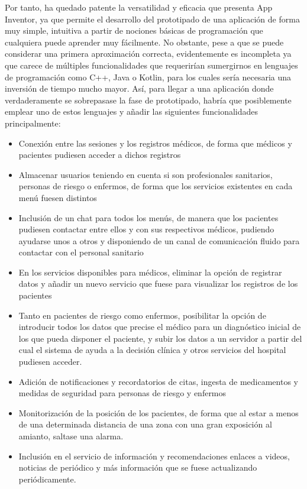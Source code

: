 \documentclass{article}
\begin{document}
Por tanto, ha quedado patente la versatilidad y eficacia que  presenta
App Inventor, ya que permite el  desarrollo  del  prototipado  de  una
aplicación de forma muy simple, intuitiva a partir de nociones básicas
de programación que cualquiera	puede  aprender  muy  fácilmente.   No
obstante, pese a que se  puede	considerar  una  primera  aproximación
correcta, evidentemente es  incompleta	ya  que  carece  de  múltiples
funcionalidades  que   requerirían   sumergirnos   en	lenguajes   de
programación como C++, Java o Kotlin, para los cuales sería  necesaria
una inversión de tiempo mucho mayor. Así, para llegar a una aplicación
donde verdaderamente se sobrepasase la fase de prototipado, habría que
posiblemente emplear uno de estos lenguajes y  añadir  las  siguientes
funcionalidades principalmente:

\begin{itemize}
\item
Conexión entre las sesiones y los registros médicos, de forma que
médicos y pacientes pudiesen acceder a dichos registros

\item
Almacenar usuarios teniendo en cuenta si son profesionales sanitarios,
personas de riesgo o enfermos, de forma que los servicios existentes
en cada menú fuesen distintos

\item
Inclusión de un chat para todos los menús, de manera que los pacientes
pudiesen contactar entre ellos y con sus respectivos médicos, pudiendo
ayudarse unos a otros y disponiendo de un canal de comunicación fluido
para contactar con el personal sanitario

\item
En los servicios disponibles para médicos, eliminar la opción de
registrar datos y añadir un nuevo servicio que fuese para visualizar
los registros de los pacientes

\item
Tanto en pacientes de riesgo como enfermos, posibilitar la opción de
introducir todos los datos que precise el médico para un diagnóstico
inicial de los que pueda disponer el paciente, y subir los datos a un
servidor a partir del cual el sistema de ayuda a la decisión clínica y
otros servicios del hospital pudiesen acceder.

\item
Adición de notificaciones y recordatorios de citas, ingesta de
medicamentos y medidas de seguridad para personas de riesgo y enfermos

\item
Monitorización de la posición de los pacientes, de forma que al estar
a menos de una determinada distancia de una zona con una gran
exposición al amianto, saltase una alarma.

\item
Inclusión en el servicio de información y recomendaciones enlaces a
videos, noticias de periódico y más información que se fuese
actualizando periódicamente.
\end{itemize}
\end{document}
